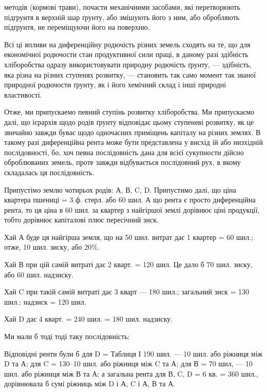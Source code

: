 \parcont{}  %
методів (кормові трави), почасти механічними засобами, які перетворюють
підґрунтя в верхній шар ґрунту, або змішують його з ним, або обробляють підґрунтя,
не переміщуючи його на поверхню.

Всі ці впливи на диференційну родючість різних земель сходять на те, що для
економічної родючости стан продуктивної сили праці, в даному разі здібність хліборобства
одразу використовувати природну родючість ґрунту, — здібність, яка різна
на різних ступенях розвитку, — становить так само момент так званої природної
родючости ґрунту, як і його хемічний склад і інші природні властивості.

Отже, ми припускаемо певний ступінь розвитку хліборобства. Ми припускаємо
далі, що ієрархія щодо родів ґрунту відповідає цьому ступеневі розвитку,
як це звичайно завжди буває щодо одночасних приміщень капіталу на різних
землях. В такому разі диференційна рента може бути представлена у висхід ій
або низхідній послідовності, бо, хоч певна послідовність дана для всієї сукупности
дійсно оброблюваних земель, проте завжди відбувається послідовний рух,
в якому складалась ця послідовність.

Припустімо землю чотирьох родів: А, В, C, D. Припустимо далі, що ціна
квартера пшениці = 3 ф. стерл. або 60 шил. А що рента є просто диференційна рента,
то ця ціна в 60 шил. за квартер з найгіршої землі дорівнює ціні продукції,
тобто дорівнює капіталові плюс пересічний зиск.

Хай А буде ця найгірша земля, що на 50 шил. витрат дає 1 квартер = 60
шил.; отже, 10 шил. зиску, або 20\%.

Хай В при цій самій витраті дає 2 кварт. = 120 шил. Це дало б 70 шил.
зиску, або 60 шил. надзиску.

Хай C при такій самій витраті дає 3 кварт — 180 шил.; загальний
зиск = 130 шил.; надзиск = 120 шил.

Хай D дає 4 кварт. = 240 шил. = 180 шил. надзиску.

Ми мали б тоді тоді таку послідовність:

Відповідні ренти були б для D = Таблиця І 190 шил. — 10 шил. або ріжниця між D та
А; для C = 130--10 шил. або ріжниця між C та А; для В = 70 шил, — 10 шил. або ріжниця
між В та А; а загальна рента для В, C, D = 6 кв. = 360 шил., дорівнювала б сумі ріжниць між
D і А, C і А, В та А.

